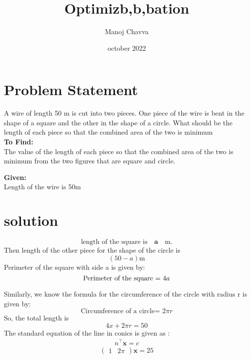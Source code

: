 \documentclass[journal,12pt,twocolumn]{IEEEtran}
\title{Optimizb,b,bation}
\author{Manoj Chavva}
\date{october 2022}
\let\vec\mathbf
\begin{document}
\maketitle
\section{Problem Statement}

\noindent A wire of length 50 m is cut into two pieces. One piece of the wire is bent in the shape of a square and the other in the shape of a circle. What should be the length of each piece so that the combined area of the two is minimum \\

\noindent \textbf{To Find:} \\
The value of the length of each piece so that the combined area of the two is minimum from the two figures that are square and circle.

\noindent \textbf{Given:} \\
Length of the wire is 50m
\section{solution}
\begin{equation}
\text{length of the square is} \quad \vec{a} \quad \text{m} .
\end{equation} 
Then length of the other piece for the shape of the circle is \begin{equation}
(50-a) \text{m}
\end{equation} 
Perimeter of the square with side a is given by: \\
\begin{equation}
\text{Perimeter of the square = } 4a \\
\label{eq-1}
\end{equation}
%
%

Similarly, we know the formula for the circumference of the circle with radius r is given by:
\begin{equation}
\text{Circumference of a circle= }2\pi r
\label{eq-2}
\end{equation}
So, the total length is 
\begin{equation}
4x + 2\pi r = 50
\end{equation} 
The standard equation of the line in conics is given as :
\begin{align}
n^\top \vec{x} = c
\end{align}
\begin{equation}
\begin{pmatrix}1 & 2\pi\end{pmatrix}  \vec{x} = 25
\end{equation}
\end{document}
